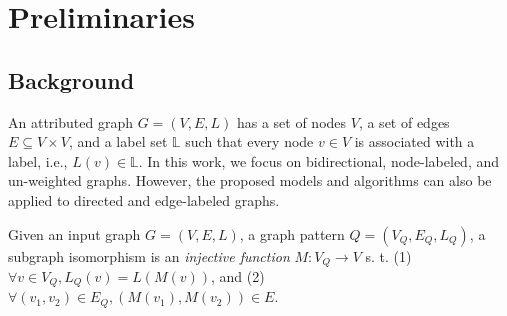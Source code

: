 \chapter{Preliminaries}
\label{sec:preliminaries}

\section{Background}
\label{sec:background}

An attributed graph $G = (V,E,L)$ has a set of nodes $V$, a set of edges
$E \subseteq V \times V$, and a label set $\mathbb{L}$ such that
every node $v \in V$ is associated with a label, i.e., $L(v) \in \mathbb{L}$.
In this work, we focus on bidirectional, node-labeled, and un-weighted
graphs. However, the proposed models and algorithms can also be applied to directed
and edge-labeled graphs.

 Given an input graph $G=(V,E,L)$, a graph pattern
$Q=(V_Q,E_Q,L_Q)$, a subgraph isomorphism is an {\em injective function} $M: V_Q \rightarrow V$ s. t.
(1) $\forall v\in V_Q, L_Q(v)= L(M(v))$, and (2) $\forall(v_1,v_2) \in E_Q, (M(v_1),M(v_2))\in E$.

